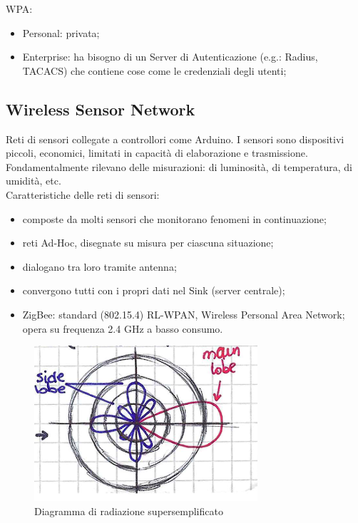 \noindent WPA:
\begin{itemize}
    \item Personal: privata;
    \item Enterprise: ha bisogno di un Server di Autenticazione (e.g.: Radius, TACACS) che contiene cose come le credenziali degli utenti; 
\end{itemize}

\subsection*{Wireless Sensor Network}
\noindent Reti di sensori collegate a controllori come Arduino. I sensori sono dispositivi piccoli, economici, limitati in capacità di elaborazione e trasmissione. Fondamentalmente rilevano delle misurazioni: di luminosità, di temperatura, di umidità, etc.\\
\noindent Caratteristiche delle reti di sensori:
\begin{itemize}
    \item composte da molti sensori che monitorano fenomeni in continuazione;
    \item reti Ad-Hoc, disegnate su misura per ciascuna situazione;
    \item dialogano tra loro tramite antenna;
    \item convergono tutti con i propri dati nel Sink (server centrale);
    \item ZigBee: standard (802.15.4) RL-WPAN, Wireless Personal Area Network; opera su frequenza 2.4 GHz a basso consumo.
\end{itemize}



\begin{figure}
 \begin{center}
 \includegraphics[width=1\linewidth]{Figures/06/onde.png}
    \caption{Diagramma di radiazione supersemplificato}
    \label{fig:06diag}
  \end{center}
\end{figure}

